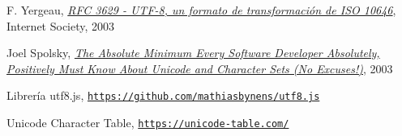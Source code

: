 \documentclass{article}
\begin{document}
\begin{thebibliography}{9}
  F. Yergeau, \href{https://tools.ietf.org/html/rfc3629}{\textit{RFC 3629 -
      UTF-8, un formato de transformación de ISO 10646}}, Internet Society, 2003

  Joel Spolsky,
  \href{https://www.joelonsoftware.com/2003/10/08/the-absolute-minimum-every-software-developer-absolutely-positively-must-know-about-unicode-and-character-sets-no-excuses/}{\textit{The
      Absolute Minimum Every Software Developer Absolutely, Positively Must Know
      About Unicode and Character Sets (No Excuses!)}}, 2003

  Librería utf8.js,
  \href{https://github.com/mathiasbynens/utf8.js}{\texttt{https://github.com/mathiasbynens/utf8.js}}

  Unicode Character Table,
  \href{https://unicode-table.com/}{\texttt{https://unicode-table.com/}}

\end{thebibliography}
\end{document}
